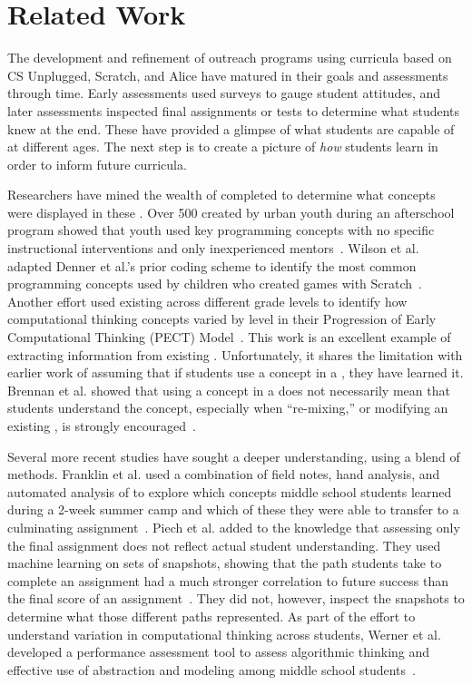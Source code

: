 \section{Related Work}
The development and refinement of outreach programs using curricula based on CS
Unplugged, Scratch, and Alice have matured in their goals and assessments
through time. Early assessments used surveys to gauge student attitudes, and
later assessments inspected final assignments or tests to determine what
students knew at the end. These have provided a glimpse of what students are
capable of at different ages. The next step is to create a picture of
\emph{how} students learn in order to inform future curricula.

Researchers have mined the wealth of completed  to determine what
concepts were displayed in these . Over 500  created by
urban youth during an afterschool program showed that youth used key
programming concepts with no specific instructional interventions and only
inexperienced mentors~\cite{Maloney:2008:PCU:1352135.1352260}. Wilson et
al. adapted Denner et al.'s prior coding scheme to identify the most common
programming concepts used by children who created games with
Scratch~\cite{Denner:2012:CGC:2072695.2073050, wilson12}. Another effort used
existing  across different grade levels to identify how
computational thinking concepts varied by level in their Progression of Early
Computational Thinking (PECT)
Model~\cite{Seiter:2013:MLP:2493394.2493403}. This work is an excellent example
of extracting information from existing . Unfortunately, it shares
the limitation with earlier work of assuming that if students use a concept in
a \sproject{}, they have learned it. Brennan et al. showed that using a concept
in a \sproject{} does not necessarily mean that students understand the
concept, especially when ``re-mixing,'' or modifying an existing \sproject{},
is strongly encouraged~\cite{brennan12}.

Several more recent studies have sought a deeper understanding, using a blend
of methods. Franklin et al. used a combination of field notes, hand analysis,
and automated analysis of  to explore which concepts middle school
students learned during a 2-week summer camp and which of these they were able
to transfer to a culminating assignment~\cite{Boe:2013:HLS:2445196.2445265,
  Franklin:2013:SBO}. Piech et al. added to the knowledge that assessing only
the final assignment does not reflect actual student understanding. They used
machine learning on sets of snapshots, showing that the path students take to
complete an assignment had a much stronger correlation to future success than
the final score of an assignment~\cite{Piech:2012:MSL:2157136.2157182}. They
did not, however, inspect the snapshots to determine what those different paths
represented. As part of the effort to understand variation in computational
thinking across students, Werner et al. developed a performance assessment tool
to assess algorithmic thinking and effective use of abstraction and modeling
among middle school students~\cite{Werner:2012:FPA:2157136.2157200}.

